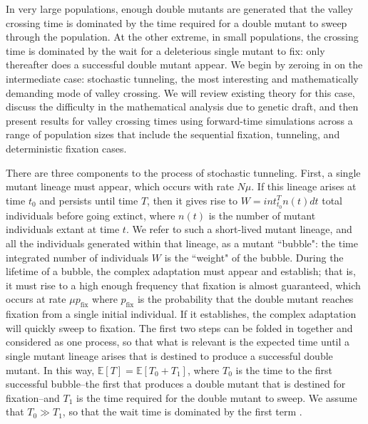 \documentclass[rmp]{revtex4}
\newcommand{\jcomment}[2][noinline]{\todo[size=\tiny,author=JVC,color=red,#1,caption={},fancyline]{#2}}
\newcommand{\pfix}{p_{\mathrm{fix}}}
\begin{document}
\begin{spacing}{1.5}
In very large populations, enough double mutants are generated that the valley crossing time is dominated by the time required for a double mutant to sweep through the population.
At the other extreme, in small populations, the crossing time is dominated by the wait for a deleterious single mutant to fix: only thereafter does a successful double mutant appear.
We begin by zeroing in on the intermediate case: stochastic tunneling, the most interesting and mathematically demanding mode of valley crossing.
We will review existing theory for this case, discuss the difficulty in the mathematical analysis due to genetic draft, and then present results for valley crossing times using forward-time simulations across a range of population sizes that include the sequential fixation, tunneling, and deterministic fixation cases.

There are three components to the process of stochastic tunneling.
First, a single mutant lineage must appear, which occurs with rate $N\mu$.
If this lineage arises at time $t_0$ and persists until time $T$, then it gives rise to $W = int_{t_0}^T n(t) dt$ total individuals before going extinct, where $n(t)$ is the number of mutant individuals extant at time $t$.
We refer to such a short-lived mutant lineage, and all the individuals generated within that lineage, as a mutant ``bubble": the time integrated number of individuals $W$ is the ``weight" of the bubble.
During the lifetime of a bubble, the complex adaptation must appear and establish; that is, it must rise to a high enough frequency that fixation is almost guaranteed, which occurs at rate $\mu \pfix$ where $\pfix$ is the probability that the double mutant reaches fixation from a single initial individual.
If it establishes, the complex adaptation will quickly sweep to fixation.
The first two steps can be folded in together and considered as one process, so that what is relevant is the expected time until a single mutant lineage arises that is destined to produce a successful double mutant.
In this way, $\mathbb{E}\left[ T \right] = \mathbb{E} \left[ T_0 + T_1 \right]$, where $T_0$ is the time to the first successful bubble--the first that produces a double mutant that is destined for fixation--and $T_1$ is the time required for the double mutant to sweep.
We assume that $T_0 \gg T_1$, so that the wait time is dominated by the first term
\jcomment{justify this briefly}.


\end{spacing}
\end{document}
